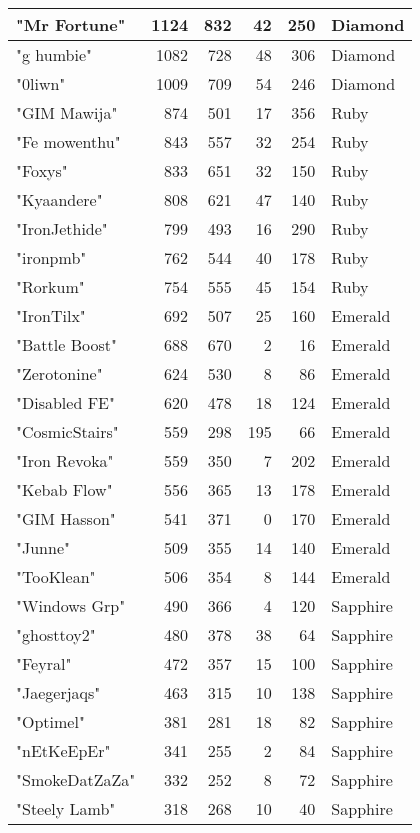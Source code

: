 \documentclass{article}
\begin{document}
\begin{table}[htbp]
\begin{tabular}{|l|r|r|r|r|l|}
"Mr Fortune" & 1124 & 832 & 42 & 250 & Diamond \\ \hline
"g humbie" & 1082 & 728 & 48 & 306 & Diamond \\ \hline
"0liwn" & 1009 & 709 & 54 & 246 & Diamond \\ \hline
"GIM Mawija" & 874 & 501 & 17 & 356 & Ruby \\ \hline
"Fe mowenthu" & 843 & 557 & 32 & 254 & Ruby \\ \hline
"Foxys" & 833 & 651 & 32 & 150 & Ruby \\ \hline
"Kyaandere" & 808 & 621 & 47 & 140 & Ruby \\ \hline
"IronJethide" & 799 & 493 & 16 & 290 & Ruby \\ \hline
"ironpmb" & 762 & 544 & 40 & 178 & Ruby \\ \hline
"Rorkum" & 754 & 555 & 45 & 154 & Ruby \\ \hline
"IronTilx" & 692 & 507 & 25 & 160 & Emerald \\ \hline
"Battle Boost" & 688 & 670 & 2 & 16 & Emerald \\ \hline
"Zerotonine" & 624 & 530 & 8 & 86 & Emerald \\ \hline
"Disabled FE" & 620 & 478 & 18 & 124 & Emerald \\ \hline
"CosmicStairs" & 559 & 298 & 195 & 66 & Emerald \\ \hline
"Iron Revoka" & 559 & 350 & 7 & 202 & Emerald \\ \hline
"Kebab Flow" & 556 & 365 & 13 & 178 & Emerald \\ \hline
"GIM Hasson" & 541 & 371 & 0 & 170 & Emerald \\ \hline
"Junne" & 509 & 355 & 14 & 140 & Emerald \\ \hline
"TooKlean" & 506 & 354 & 8 & 144 & Emerald \\ \hline
"Windows Grp" & 490 & 366 & 4 & 120 & Sapphire \\ \hline
"ghosttoy2" & 480 & 378 & 38 & 64 & Sapphire \\ \hline
"Feyral" & 472 & 357 & 15 & 100 & Sapphire \\ \hline
"Jaegerjaqs" & 463 & 315 & 10 & 138 & Sapphire \\ \hline
"Optimel" & 381 & 281 & 18 & 82 & Sapphire \\ \hline
"nEtKeEpEr" & 341 & 255 & 2 & 84 & Sapphire \\ \hline
"SmokeDatZaZa" & 332 & 252 & 8 & 72 & Sapphire \\ \hline
"Steely Lamb" & 318 & 268 & 10 & 40 & Sapphire \\ \hline

\end{tabular}
\end{table}
\end{document}
